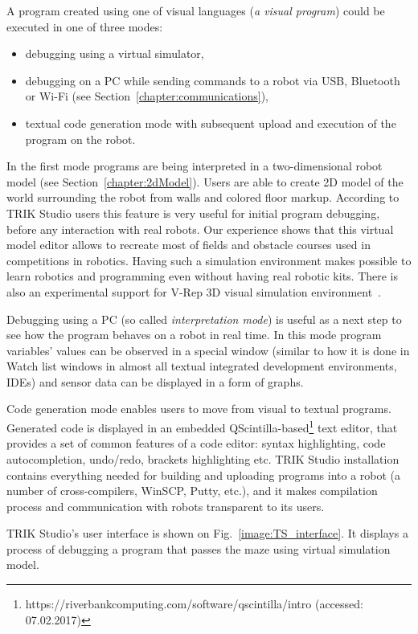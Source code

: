 \documentclass[conference]{IEEEtran}
\begin{document}
A program created using one of visual languages (\textit{a visual program}) could be executed in one of three modes:
\begin{itemize}
    \item debugging using a virtual simulator,
    \item debugging on a PC while sending commands to a robot via USB, Bluetooth or Wi-Fi (see Section~\ref{chapter:communications}),
    \item textual code generation mode with subsequent upload and execution of the program on the robot.
\end{itemize}

In the first mode programs are being interpreted in a two-dimensional robot model (see Section~\ref{chapter:2dModel}). Users are able to create 2D model of the world surrounding the robot from walls and colored floor markup. According to TRIK Studio users this feature is very useful for initial program debugging, before any interaction with real robots. Our experience shows that this virtual model editor allows to recreate most of fields and obstacle courses used in competitions in robotics. Having such a simulation environment makes possible to learn robotics and programming even without having real robotic kits. There is also an experimental support for V-Rep 3D visual simulation environment~\cite{rohmer2013v}.

Debugging using a PC (so called \textit{interpretation mode}) is useful as a next step to see how the program behaves on a robot in real time. In this mode program variables' values can be observed in a special window (similar to how it is done in Watch list windows in almost all textual integrated development environments, IDEs) and sensor data can be displayed in a form of graphs. 

Code generation mode enables users to move from visual to textual programs. Generated code is displayed in an embedded QScintilla-based\footnote{https://riverbankcomputing.com/software/qscintilla/intro (accessed: 07.02.2017)} text editor, that provides a set of common features of a code editor: syntax highlighting, code autocompletion, undo/redo, brackets highlighting etc. TRIK Studio installation contains everything needed for building and uploading programs into a robot (a number of cross-compilers, WinSCP, Putty, etc.), and it makes compilation process and communication with robots transparent to its users.

TRIK Studio's user interface is shown on Fig.~\ref{image:TS_interface}. It displays a process of debugging a program that passes the maze using virtual simulation model.
\end{document}
